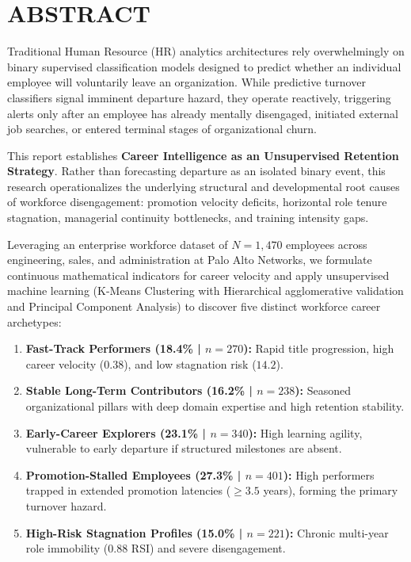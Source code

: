 \documentclass[12pt,a4paper,oneside]{report}
\newcommand{\TargetEnterprise}{Palo Alto Networks}
\begin{document}
\clearpage
\chapter*{ABSTRACT}

Traditional Human Resource (HR) analytics architectures rely overwhelmingly on binary supervised classification models designed to predict whether an individual employee will voluntarily leave an organization. While predictive turnover classifiers signal imminent departure hazard, they operate reactively, triggering alerts only after an employee has already mentally disengaged, initiated external job searches, or entered terminal stages of organizational churn.

This report establishes \textbf{Career Intelligence as an Unsupervised Retention Strategy}. Rather than forecasting departure as an isolated binary event, this research operationalizes the underlying structural and developmental root causes of workforce disengagement: promotion velocity deficits, horizontal role tenure stagnation, managerial continuity bottlenecks, and training intensity gaps.

Leveraging an enterprise workforce dataset of $N = 1,470$ employees across engineering, sales, and administration at \TargetEnterprise, we formulate continuous mathematical indicators for career velocity and apply unsupervised machine learning (K-Means Clustering with Hierarchical agglomerative validation and Principal Component Analysis) to discover five distinct workforce career archetypes:
\begin{enumerate}
  \item \textbf{Fast-Track Performers (18.4\% | $n=270$):} Rapid title progression, high career velocity ($0.38$), and low stagnation risk ($14.2$).
  \item \textbf{Stable Long-Term Contributors (16.2\% | $n=238$):} Seasoned organizational pillars with deep domain expertise and high retention stability.
  \item \textbf{Early-Career Explorers (23.1\% | $n=340$):} High learning agility, vulnerable to early departure if structured milestones are absent.
  \item \textbf{Promotion-Stalled Employees (27.3\% | $n=401$):} High performers trapped in extended promotion latencies ($\ge 3.5$ years), forming the primary turnover hazard.
  \item \textbf{High-Risk Stagnation Profiles (15.0\% | $n=221$):} Chronic multi-year role immobility ($0.88$ RSI) and severe disengagement.
\end{enumerate}
\end{document}
